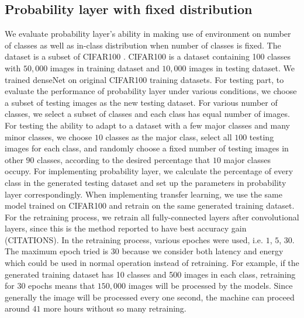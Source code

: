 \documentclass{article}
\begin{document}
\subsection{Probability layer with fixed distribution}
We evaluate probability layer's ability in making use of environment on number of classes as well as in-class distribution when number of classes is fixed. The dataset is a subset of CIFAR100 \cite{krizhevsky2009learning}. CIFAR100 \cite{krizhevsky2009learning} is a dataset containing 100 classes with $50,000$ images in training dataset and $10,000$ images in testing dataset. We trained denseNet \cite{huang2017densely} on original CIFAR100 training datasets. For testing part, to evaluate the performance of probability layer under various conditions, we choose a subset of testing images as the new testing dataset. For various number of classes, we select a subset of classes and each class has equal number of images. For testing the ability to adapt to a dataset with a few major classes and many minor classes, we choose $10$ classes as the major class, select all $100$ testing images for each class, and randomly choose a fixed number of testing images in other $90$ classes, according to the desired percentage that $10$ major classes occupy. For implementing probability layer, we calculate the percentage of every class in the generated testing dataset and set up the parameters in probability layer correspondingly. When implementing transfer learning, we use the same model trained on CIFAR100 and retrain on the same generated training dataset. For the retraining process, we retrain all fully-connected layers after convolutional layers, since this is the method reported to have best accuracy gain (CITATIONS). In the retraining process, various epoches were used, i.e. $1$, $5$, $30$. The maximum epoch tried is $30$ because we consider both latency and energy which could be used in normal operation instead of retraining. For example, if the generated training dataset has 10 classes and 500 images in each class, retraining for $30$ epochs means that $150,000$ images will be processed by the models. Since generally the image will be processed every one second, the machine can proceed around $41$ more hours without so many retraining.
\end{document}
